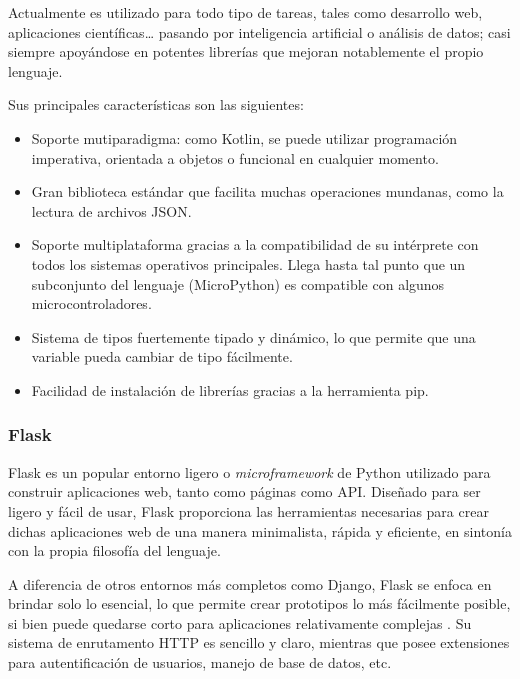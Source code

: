             Actualmente es utilizado para todo tipo de tareas, tales como desarrollo web, aplicaciones científicas… 
            pasando por inteligencia artificial o análisis de datos; casi siempre apoyándose en potentes librerías 
            que mejoran notablemente el propio lenguaje. 

            Sus principales características son las siguientes:
            \begin{itemize}
                \item Soporte mutiparadigma: como Kotlin, se puede utilizar programación imperativa, orientada a objetos o 
                funcional en cualquier momento.
                \item Gran biblioteca estándar que facilita muchas operaciones mundanas, como la lectura de archivos JSON.
                \item Soporte multiplataforma gracias a la compatibilidad de su intérprete con todos los sistemas 
                operativos principales. Llega hasta tal punto que un subconjunto del lenguaje (MicroPython) es compatible 
                con algunos microcontroladores.
                \item Sistema de tipos fuertemente tipado y dinámico, lo que permite que una variable pueda cambiar de 
                tipo fácilmente.
                \item Facilidad de instalación de librerías gracias a la herramienta pip.
            \end{itemize}
        
        \subsubsection{Flask}

            Flask es un popular entorno ligero o \textit{microframework} de Python utilizado para construir aplicaciones 
            web, tanto como páginas como API. Diseñado para ser ligero y fácil de usar, Flask proporciona las herramientas 
            necesarias para crear dichas aplicaciones web de una manera minimalista, rápida y eficiente, en sintonía con 
            la propia filosofía del lenguaje. 

            A diferencia de otros entornos más completos como Django, Flask se enfoca en brindar solo lo esencial, lo que 
            permite crear prototipos lo más fácilmente posible, si bien puede quedarse corto para aplicaciones 
            relativamente complejas \cite{rodriguez_flask_2014}. Su sistema de enrutamento HTTP es sencillo y claro, mientras que posee extensiones 
            para autentificación de usuarios, manejo de base de datos, etc. 

